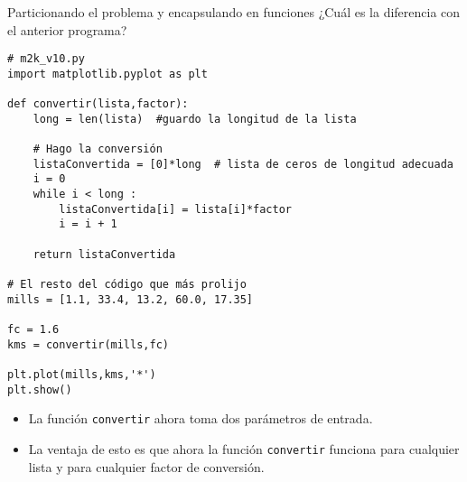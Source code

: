 \documentclass[9pt]{beamer}
\begin{document}
\begin{frame}[fragile]{Particionando el problema y encapsulando en funciones}
¿Cuál es la diferencia con el anterior programa?
\footnotesize{\begin{verbatim}
# m2k_v10.py
import matplotlib.pyplot as plt
	
def convertir(lista,factor):
    long = len(lista)  #guardo la longitud de la lista
	
    # Hago la conversión
    listaConvertida = [0]*long  # lista de ceros de longitud adecuada
    i = 0
    while i < long :
        listaConvertida[i] = lista[i]*factor
        i = i + 1
    
    return listaConvertida
	
# El resto del código que más prolijo
mills = [1.1, 33.4, 13.2, 60.0, 17.35]
	
fc = 1.6
kms = convertir(mills,fc)
	
plt.plot(mills,kms,'*')
plt.show()
\end{verbatim}}\pause
\begin{itemize}
	\item La función \verb|convertir| ahora toma dos parámetros de entrada.\pause
	\item La ventaja de esto es que ahora la función \verb|convertir| funciona \alert{para cualquier lista y para cualquier factor de conversión}.
\end{itemize}

\end{frame}
\end{document}
